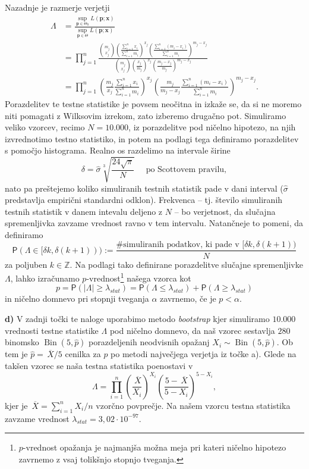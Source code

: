 \documentclass[a4paper,11pt]{article}
\newcommand{\olsi}[1]{\,\overline{\!{#1}}} %
\newcommand{\sumin}{\sum_{i = 1}^n}
\newcommand{\prob}{\mathsf{P}}
\newcommand{\Z}{\mathbb{Z}}
\DeclareMathOperator{\bin}{Bin}
\begin{document}
Nazadnje je razmerje verjetji
\begin{align*}
    \Lambda &= 
    \frac{\sup_{\bm{p} \in \Theta_0} L(\bm{p}; \bm{x})}{\sup_{\bm{p} \in \Theta} L(\bm{p}; \bm{x})}  \\ 
    &= \prod_{j = 1}^n
    \frac{\binom{m_j}{x_j} \left(\frac{\sumin x_i}{\sumin m_i}\right)^{x_j} \left(\frac{\sumin(m_i - x_i)}{\sumin m_i}\right)^{m_j - x_j}}{\binom{m_j}{x_j} \left(\frac{x_j}{m_j}\right)^{x_j} \left(\frac{m_j - x_j}{m_j}\right)^{m_j - x_j}} \\ &= 
    \prod_{j = 1}^n
    \left(\frac{m_j}{x_j} \frac{\sumin x_i}{\sumin m_i}\right)^{x_j}
    \left(\frac{m_j}{m_j - x_j}\frac{\sumin(m_i - x_i)}{\sumin m_i}\right)^{m_j - x_j}.
\end{align*}
Porazdelitev te testne statistike je povsem neočitna in izkaže se, da si ne moremo niti pomagati z Wilksovim izrekom, zato izberemo drugačno pot. Simuliramo veliko vzorcev, recimo $N = 10.000$, iz porazdelitve pod ničelno hipotezo, na njih izvrednotimo testno statistiko, in potem na podlagi tega definiramo porazdelitev s pomočjo histograma. Realno os razdelimo na intervale širine 
\[
    \delta = \hat{\sigma} \sqrt[3]{\frac{24\sqrt{\pi}}{N}} \quad \text{ po Scottovem pravilu},
\]  
nato pa preštejemo koliko simuliranih testnih statistik pade v dani interval ($\hat{\sigma}$ predstavlja empirični standardni odklon).  Frekvenca -- tj. število simuliranih testnih statistik v danem intevalu deljeno z $N$ -- bo verjetnost, da slučajna spremenljivka zavzame vrednost ravno v tem intervalu. Natančneje to pomeni, da definiramo
\[
    \prob(\Lambda \in [\delta k, \delta(k+1))) := \frac{\text{\# simuliranih podatkov, ki pade v $[\delta k, \delta(k+1))$}}{N}
\]
za poljuben $k \in \Z$. Na podlagi tako definirane porazdelitve slučajne spremenljivke $\Lambda$, lahko izračunamo $p$-vrednost\footnote{$p$-vrednost opažanja je najmanjša možna meja pri kateri ničelno hipotezo zavrnemo z vsaj tolikšnjo stopnjo tveganja.} našega vzorca kot
\[
    p = \prob(\left\lvert \Lambda \right\rvert \geq \lambda_{stat}) = \prob(\Lambda \leq \lambda_{stat}) + \prob(\Lambda \geq \lambda_{stat})
\]
in ničelno domnevo pri stopnji tveganja $\alpha$ zavrnemo, če je $p < \alpha$.
\newline

\noindent
\textbf{d) } V zadnji točki te naloge uporabimo metodo \emph{bootstrap} kjer simuliramo $10.000$ vrednosti testne statistike $\Lambda$ pod ničelno domnevo, da naš vzorec sestavlja $280$ binomsko $\bin(5, \hat{p})$ porazdeljenih neodvisnih opažanj $X_i \sim \bin(5, \hat{p})$. Ob tem je $\hat{p} = \olsi{X}/5$ cenilka za $p$ po metodi največjega verjetja iz točke a). Glede na takšen vzorec se naša testna statistika poenostavi v 
\[
    \Lambda = \prod_{i = 1}^n \left(\frac{\olsi{X}}{X_i}\right)^{X_i} \left( \frac{5 - \olsi{X}}{5 - X_i}\right)^{5 - X_i},
\]
kjer je $\olsi{X} = \sumin X_i/n$ vzorčno povprečje. Na našem vzorcu testna statistika zavzame vrednost $\lambda_{stat} = 3,02 \cdot 10^{-97}$.
\end{document}
